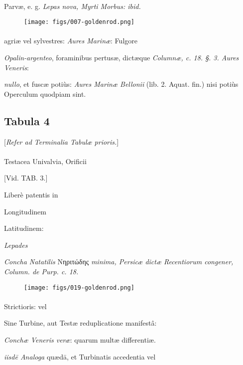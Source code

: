 \documentclass[a4paper, 11pt, oneside, polutonikogreek, german]{article}
\begin{document}
\paragraph{}
Parvæ, e. g. \emph{Lepas nova, Myrti Morbus: ibid.}
\begin{figure}[H]
\centering
\texttt{[image: figs/007-goldenrod.png]}
\end{figure}
\paragraph{}
agriæ vel sylvestres: \emph{Aures Marinæ}: Fulgore

\emph{Opalin-argenteo}, foraminibus pertusæ, dictæque \emph{Columnæ, c. 18. §. 3. Aures Veneris}:

\emph{nullo}, et fuscæ potiùs: \emph{Aures Marinæ Bellonii} (lib. 2. Aquat. fin.) nisi potiùs Operculum quodpiam sint.
\clearpage
\subsection{Tabula 4}
\begin{center}
[\emph{Refer ad Terminalia Tabulæ prioris.}]
\end{center}
\paragraph{}
Testacea Univalvia, Orificii

[Vid. TAB. 3.]

Liberè patentis in

Longitudinem

Latitudinem:

\emph{Lepades}

\emph{Concha Natatilis} Νηριτώδης \emph{minima, Persicæ dictæ Recentiorum congener, Column. de Purp. c. 18.}
\begin{figure}[H]
\centering
\texttt{[image: figs/019-goldenrod.png]}
\end{figure}
\paragraph{}
Strictioris: vel

Sine Turbine, aut Testæ reduplicatione manifestâ:

\emph{Conchæ Veneris veræ}: quarum multæ differentiæ.

\emph{iisdē Analoga} quædā, et Turbinatis accedentia vel
\end{document}
